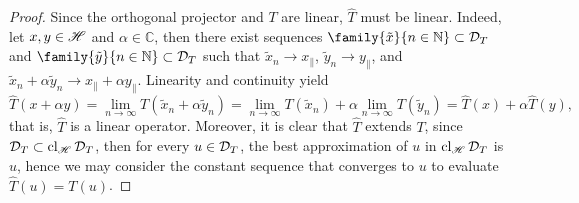 \begin{proof}
    Since the orthogonal projector and \(T\) are linear, \(\hat{T}\) must be linear. Indeed, let \(x, y \in \mathscr{H}\) and \(\alpha \in \mathbb{C}\), then there exist sequences \(\family{\tilde{x}}{n \in \mathbb{N}} \subset \domain{T}\) and \(\family{\tilde{y}}{n\in \mathbb{N}} \subset \domain{T}\) such that \(\tilde{x}_n \to x_\parallel\), \(\tilde{y}_n \to y_\parallel\), and \(\tilde{x}_n + \alpha \tilde{y}_n \to x_\parallel + \alpha y_\parallel\). Linearity and continuity yield
    \begin{equation*}
        \hat{T}(x + \alpha y) = \lim_{n \to \infty}{T(\tilde{x}_n + \alpha \tilde{y}_n)}= \lim_{n \to \infty}{T(\tilde{x}_n)}+ \alpha \lim_{n\to\infty}{T(\tilde{y}_n)} = \hat{T}(x) + \alpha \hat{T}(y),
    \end{equation*}
    that is, \(\hat{T}\) is a linear operator. Moreover, it is clear that \(\hat{T}\) extends \(T\), since \(\mathcal{D}_{T} \subset \operatorname{cl}_{\mathscr{H}}{\mathcal{D}_{T}}\), then for every \(u \in \mathcal{D}_{T}\), the best approximation of \(u\) in \(\operatorname{cl}_{\mathscr{H}}{\mathcal{D}_{T}}\) is \(u\), hence we may consider the constant sequence that converges to \(u\) to evaluate \(\hat{T}(u) = T(u)\).
\end{proof}
